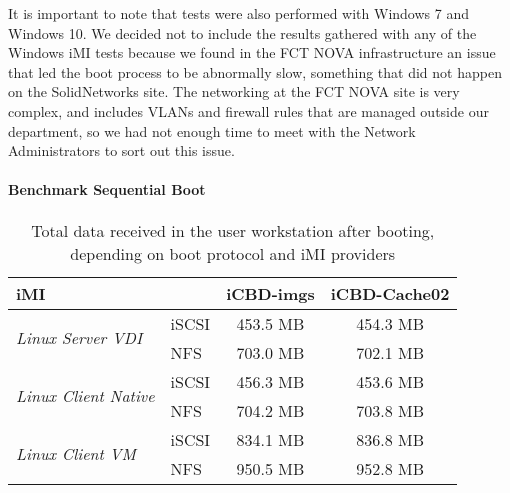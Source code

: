 It is important to note that tests were also performed with Windows 7 and Windows 10. We decided not to include the results gathered with any of the Windows iMI tests because we found in the FCT NOVA infrastructure an issue that led the boot process to be abnormally slow, something that did not happen on the SolidNetworks site. The networking at the FCT NOVA site is very complex, and includes VLANs and firewall rules that are managed outside our department, so we had not enough time to meet with the Network Administrators to sort out this issue.



\paragraph{Benchmark Sequential Boot}
\label{par:eval_cache_bootstorm}

\begin{table}[h]
\centering
\begin{tabular}{llcc}
\textbf{iMI} &  & \textbf{iCBD-imgs} & \textbf{iCBD-Cache02} \\ \hline
\multirow{2}{*}{\textit{Linux Server VDI}} & iSCSI & 453.5 MB & 454.3 MB \\
 & NFS & 703.0 MB & 702.1 MB \\ \hline
\multirow{2}{*}{\textit{Linux Client Native}} & iSCSI & 456.3 MB & 453.6 MB \\
 & NFS & 704.2 MB & 703.8 MB \\ \hline
\multirow{2}{*}{\textit{Linux Client VM}} & iSCSI & 834.1 MB & 836.8 MB \\
 & NFS & 950.5 MB & 952.8 MB
\end{tabular}
\caption{Total data received in the user workstation after booting, depending on boot protocol and iMI providers}
\label{tab:boot_totaldata}
\end{table}


